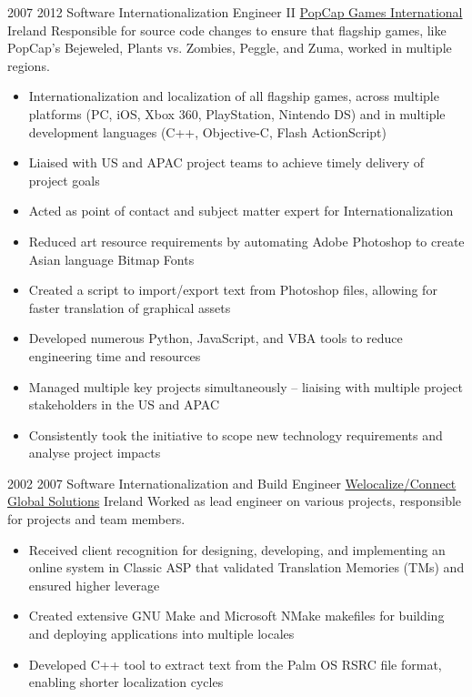 
\begin{twenty}
\twentyitem
  {2007}
  {2012}
  {Software Internationalization Engineer II}
  {\href{https://www.popcap.com/}{PopCap Games International}}
  {Ireland}
  {Responsible for source code changes to ensure that flagship games, like PopCap’s Bejeweled, Plants vs. Zombies, Peggle, and Zuma, worked in multiple regions.}
  {\begin{itemize}
    \item Internationalization and localization of all flagship games, across multiple platforms (PC, iOS, Xbox 360, PlayStation, Nintendo DS) and in multiple development languages (C++, Objective-C, Flash ActionScript)
    \item Liaised with US and APAC project teams to achieve timely delivery of project goals
    \item Acted as point of contact and subject matter expert for Internationalization
  \end{itemize}
  }
  {\begin{itemize}
    \item Reduced art resource requirements by automating Adobe Photoshop to create Asian language Bitmap Fonts
    \item Created a script to import/export text from Photoshop files, allowing for faster translation of graphical assets
    \item Developed numerous Python, JavaScript, and VBA tools to reduce engineering time and resources
    \item Managed multiple key projects simultaneously – liaising with multiple project stakeholders in the US and APAC
    \item Consistently took the initiative to scope new technology requirements and analyse project impacts
  \end{itemize}
  }
\end{twenty}

\vspace{0.25\baselineskip}
\begin{twenty}
\twentyitem
  {2002}
  {2007}
  {Software Internationalization and Build Engineer}
  {\href{https://www.welocalize.com/}{Welocalize/Connect Global Solutions}}
  {Ireland}
  {Worked as lead engineer on various projects, responsible for projects and team members.}
  {}
  {\begin{itemize}
    \item Received client recognition for designing, developing, and implementing an online system in Classic ASP that validated Translation Memories (TMs) and ensured higher leverage
    \item Created extensive GNU Make and Microsoft NMake makefiles for building and deploying applications into multiple locales
    \item Developed C++ tool to extract text from the Palm OS RSRC file format, enabling shorter localization cycles
  \end{itemize}
  }
\end{twenty}

